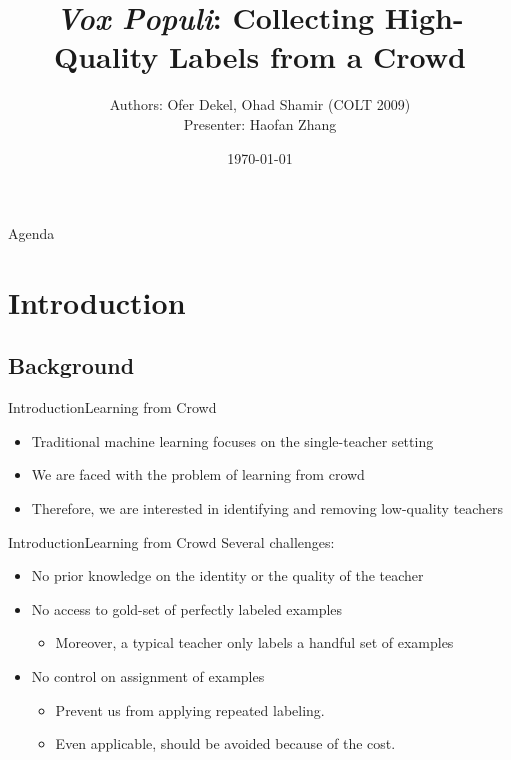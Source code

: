\documentclass[10pt,table,mathserif]{beamer}
\title[Vox Populi: Collecting High-Quality Labels from a Crowd]%
{\textsl{Vox Populi}: Collecting High-Quality Labels from a Crowd \\
}
\author[Dekel \& Shamir] %
{
  Authors: Ofer Dekel, Ohad Shamir (COLT 2009)\\
  Presenter: Haofan Zhang
}
\institute[
  David R. Cheriton School of Computer Science, University of Waterloo
] %
{%
  David R. Cheriton School of Computer Science,\\
  University of Waterloo,\\
  Waterloo, Canada
}
\date{\today}
\begin{document}
\begin{frame}[plain] %
  \titlepage
\end{frame}

\begin{frame}{Agenda}{}
\tableofcontents
\end{frame}

\section{Introduction}
\subsection{Background}

\begin{frame}{Introduction}{Learning from Crowd}
  \begin{itemize}
    \item Traditional machine learning focuses on the \alert{single-teacher setting} \pause
    \item We are faced with the problem of \alert{learning from crowd} \pause
    \item Therefore, we are interested in identifying and removing low-quality teachers
  \end{itemize}
\end{frame}

\begin{frame}{Introduction}{Learning from Crowd}
  Several challenges: \pause
  \begin{itemize}
    \item No prior knowledge on the identity or the quality of the teacher \pause
    \item No access to gold-set of perfectly labeled examples \pause
      \begin{itemize}
        \item Moreover, a typical teacher only labels a handful set of examples
      \end{itemize} \pause
    \item No control on assignment of examples \pause
      \begin{itemize}
        \item Prevent us from applying \alert{repeated labeling}.
        \item Even applicable, should be avoided because of the cost.
      \end{itemize}
  \end{itemize}
\end{frame}
\end{document}
